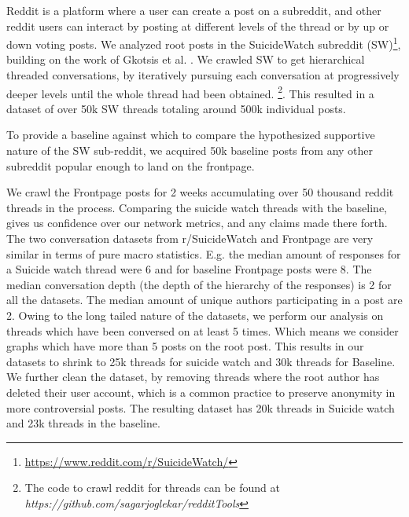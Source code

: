 Reddit is a platform where a user can create a post on a subreddit, and other reddit users can interact by posting at different levels of the thread or by up or down voting posts. We analyzed root posts in the SuicideWatch subreddit (SW)\footnote{\url{https://www.reddit.com/r/SuicideWatch/}}, building on the work of Gkotsis et al. \cite{gkotsis2017characterisation}.
We crawled SW to get hierarchical threaded conversations,
by iteratively pursuing each conversation at progressively deeper levels until the whole thread had been obtained. \footnote{The code to crawl reddit for threads can be found at \textit{https://github.com/sagarjoglekar/redditTools}}. This resulted in a dataset of over 50k SW threads totaling around 500k individual posts. 

To provide a baseline against which to compare the hypothesized supportive nature of the SW sub-reddit, we acquired 50k baseline posts from any other subreddit popular enough to land on the frontpage.

We crawl the Frontpage posts for 2 weeks accumulating over 50 thousand reddit threads in the process. 
Comparing the suicide watch threads with the baseline, gives us confidence over our network metrics, and any claims made there forth. 
The two conversation datasets from r/SuicideWatch and Frontpage are very similar in terms of pure macro statistics. E.g. the median amount of responses for a Suicide watch thread were 6 and for baseline Frontpage posts were 8. The median conversation depth (the depth of the hierarchy of the responses) is 2 for all the datasets. The median amount of unique authors participating in a post are 2. 
Owing to the long tailed nature of the datasets, we perform our analysis on threads which have been conversed on at least 5 times. Which means we consider graphs which have more than 5 posts on the root post. This results in our datasets to shrink to 25k threads for suicide watch and 30k threads for Baseline. We further clean the dataset, by removing threads where the root author has deleted their user account, which is a common practice to preserve anonymity in more controversial posts. The resulting dataset has 20k threads in Suicide watch and 23k threads in the baseline. 


